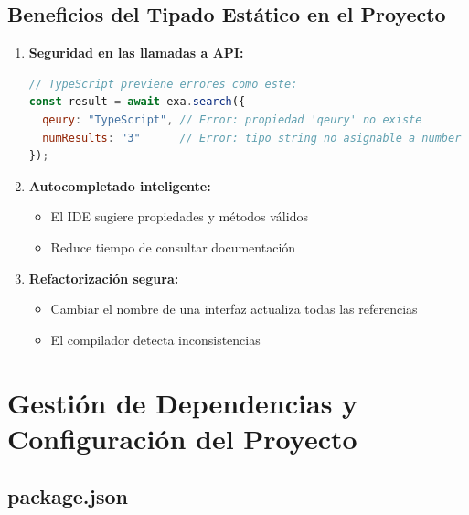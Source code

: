 \documentclass[12pt,a4paper]{article}
\begin{document}
\subsection{Beneficios del Tipado Estático en el Proyecto}

\begin{enumerate}
    \item \textbf{Seguridad en las llamadas a API:}
    \begin{lstlisting}[language=JavaScript]
// TypeScript previene errores como este:
const result = await exa.search({
  qeury: "TypeScript", // Error: propiedad 'qeury' no existe
  numResults: "3"      // Error: tipo string no asignable a number
});
    \end{lstlisting}

    \item \textbf{Autocompletado inteligente:}
    \begin{itemize}
        \item El IDE sugiere propiedades y métodos válidos
        \item Reduce tiempo de consultar documentación
    \end{itemize}

    \item \textbf{Refactorización segura:}
    \begin{itemize}
        \item Cambiar el nombre de una interfaz actualiza todas las referencias
        \item El compilador detecta inconsistencias
    \end{itemize}
\end{enumerate}

\newpage

\section{Gestión de Dependencias y Configuración del Proyecto}

\subsection{package.json}
\end{document}
